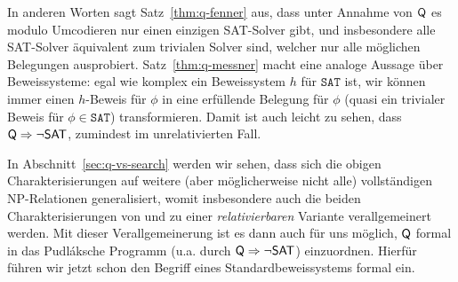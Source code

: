 In anderen Worten sagt Satz~\ref{thm:q-fenner} aus, dass unter Annahme von $\mathsf{Q}$ es modulo Umcodieren nur einen einzigen SAT-Solver gibt, und insbesondere alle SAT-Solver äquivalent zum trivialen Solver sind, welcher nur alle möglichen Belegungen ausprobiert.
Satz~\ref{thm:q-messner} macht eine analoge Aussage über Beweissysteme: egal wie komplex ein Beweissystem $h$ für $\mathtt{SAT}$ ist, wir können immer einen $h$-Beweis für $\phi$ in eine erfüllende Belegung für $\phi$ (quasi ein trivialer Beweis für $\phi\in\mathtt{SAT}$) transformieren. Damit ist auch leicht zu sehen, dass $\mathsf{Q}\Rightarrow \neg\mathsf{SAT}$, zumindest im unrelativierten Fall.

In Abschnitt~\ref{sec:q-vs-search} werden wir sehen, dass sich die obigen Charakterisierungen auf weitere (aber möglicherweise nicht alle) vollständigen NP-Relationen generalisiert, womit insbesondere auch die beiden Charakterisierungen von \citeauthor{fenner_inverting_2003} und \citeauthor{kobler_is_2000} zu einer \emph{relativierbaren} Variante verallgemeinert werden.
Mit dieser Verallgemeinerung ist es dann auch für uns möglich, $\mathsf{Q}$ formal in das Pudláksche Programm (u.a. durch $\mathsf{Q}\Rightarrow \neg\mathsf{SAT}$) einzuordnen. Hierfür führen wir jetzt schon den Begriff eines Standardbeweissystems formal ein.

